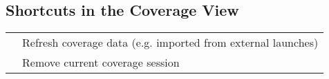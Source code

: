 \subsection{Shortcuts in the Coverage View}
\begin{tabularx}{\linewidth}{@{}lX@{}}
	\keys{F5}&			Refresh coverage data (e.g. imported from external launches)\\
	\keys{\del}&		Remove current coverage session\\
\end{tabularx}
